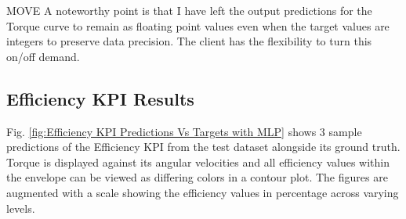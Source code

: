 \documentclass{report} %
\begin{document}
MOVE A noteworthy point is that I have left the output predictions for the Torque curve to remain as floating point values even when the target values are integers 
to preserve data precision. The client has the flexibility to turn this on/off demand. 

\subsection{Efficiency KPI Results}\label{subsec:Efficiency KPI Results with MLP Efficiency KPI Regularization}
Fig. \ref{fig:Efficiency KPI Predictions Vs Targets with MLP} shows 3 sample predictions of the Efficiency \ac{KPI} from the test dataset alongside its ground truth.
Torque is displayed against its angular velocities and all efficiency values within the envelope can be viewed as differing colors in a contour plot. 
The figures are augmented with a scale showing the efficiency values in percentage across varying levels. 
\end{document}

